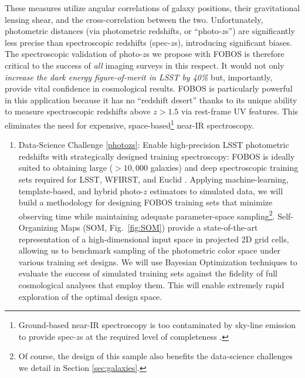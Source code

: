 \documentclass[oneside,11pt]{amsart}
\newcounter{chalno}
\newcommand{\chal}[1]{\refstepcounter{chalno}\label{#1}}
\begin{document}
These measures utilize angular correlations of galaxy positions, their
gravitational lensing shear, and the cross-correlation between the two.
Unfortunately, photometric distances (via photometric redshifts, or
``photo-$z$s'') are significantly less precise than spectroscopic
redshifts (spec-$z$s), introducing significant biases.  The
spectroscopic validation of photo-$z$s we propose with FOBOS is
therefore critical to the success of {\it all} imaging surveys in this
respect. It would not only \emph{increase the dark energy
figure-of-merit in LSST by 40\%} \citep{newman15} but, importantly,
provide vital confidence in cosmological results.  FOBOS is particularly
powerful in this application because it has no ``redshift desert'' thanks to its unique ability to measure spectroscopic redshifts above $z > 1.5$ via
rest-frame UV features.  This eliminates the need for expensive, space-based\footnote{Ground-based near-IR
spectroscopy is too contaminated by sky-line emission to provide spec-$z$s at the required level of completeness
\citep{newman15}.} near-IR spectroscopy.

\chal{photozs}
%
\begin{enumerate}[rightmargin=0.2cm,leftmargin=0.2cm]
%
\item[] {\textsf {\large Data-Science Challenge \ref{photozs}: Enable
high-precision LSST photometric redshifts with strategically designed
training spectroscopy:}}  FOBOS is ideally suited to obtaining large
($>10,000$ galaxies) and deep spectroscopic training sets required for
LSST, WFIRST, and Euclid \citep[see][] {newman15}.  Applying
machine-learning, template-based, and hybrid photo-$z$ estimators to
simulated data, we will build a methodology for designing FOBOS training
sets that minimize observing time while maintaining adequate
parameter-space sampling\footnote{
%
Of course, the design of this sample also benefits the data-science
challenges we detail in Section \ref{sec:galaxies}.}.
%
Self-Organizing Maps (SOM, Fig.~\ref {fig:SOM}) provide a
state-of-the-art representation of a high-dimensional input space in
projected 2D grid cells, allowing us to benchmark sampling of the
photometric color space under various training set designs.  We will use
Bayesian Optimization techniques to evaluate the success of simulated training sets against the fidelity of full  
cosmological analyses that employ them.  This will enable extremely rapid exploration of the
optimal design space.

\end{enumerate}
\end{document}
